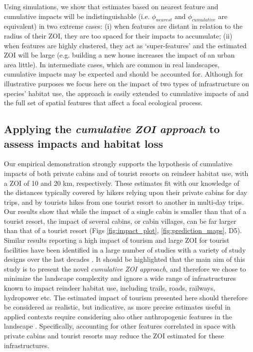 \documentclass[titlepage]{article}
\begin{document}
Using simulations, we show that estimates based on nearest feature and cumulative impacts will be indistinguishable (i.e. $\phi_{nearest}$ and $\phi_{cumulative}$ are equivalent) in two extreme cases: (i) when features are distant in relation to the radius of their ZOI, they are too spaced for their impacts to accumulate; (ii) when features are highly clustered, they act as `super-features' and the estimated ZOI will be large (e.g. building a new house increases the impact of an urban area little). In intermediate cases, which are common in real landscapes, cumulative impacts may be expected and should be accounted for. Although for illustrative purposes we focus here on the impact of two types of infrastructure on species’ habitat use, the approach is easily extended to cumulative impacts of and the full set of spatial features that affect a focal ecological process.

\subsection{Applying the \textit{cumulative ZOI approach} to assess impacts and habitat loss}

Our empirical demonstration strongly supports the hypothesis of cumulative impacts of both private cabins and of tourist resorts on reindeer habitat use, with a ZOI of 10 and 20 km, respectively. These estimates fit with our knowledge of the distances typically covered by hikers relying upon their private cabins for day trips, and by tourists hikes from one tourist resort to another in multi-day trips. Our results show that while the impact of a single cabin is smaller than that of a tourist resort, the impact of several cabins, or cabin villages, can be far larger than that of a tourist resort (Figs \ref{fig:impact_plot}, \ref{fig:prediction_maps}, D5). Similar results reporting a high impact of tourism and large ZOI for tourist facilities have been identified in a large number of studies with a variety of study designs over the last decades \citep{gundersen_large-scale_2019,panzacchi_searching_2015,panzacchi_predicting_2016,panzacchi_wild_2022,polfus_identifying_2011,nellemann_winter_2001,nellemann_effects_2010}. It should be highlighted that the main aim of this study is to present the novel \textit{cumulative ZOI approach}, and therefore we chose to minimize the landscape complexity and ignore a wide range of infrastructures known to impact reindeer habitat use, including trails, roads, railways, hydropower etc. The estimated impact of tourism presented here should therefore be considered as realistic, but indicative, as more precise estimates useful in applied contexts require considering also other anthropogenic features in the landscape \citep[see e.g.][]{panzacchi_searching_2015,panzacchi_wild_2022}. Specifically, accounting for other features correlated in space with private cabins and tourist resorts may reduce the ZOI estimated for these infrastructures.   
\end{document}
